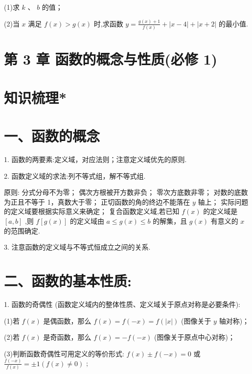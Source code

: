 (1)求 $k$ 、 $b$ 的值；

(2)当 $x$ 满足 $f\left( x\right)  > g\left( x\right)$ 时,求函数 $y = \frac{g\left( x\right)  + 1}{f\left( x\right) } + \left| {x - 4}\right|  + \left| {x + 2}\right|$ 的最小值.

\section*{第 3 章 函数的概念与性质(必修 1)}

\section*{知识梳理*}

\section*{一、函数的概念}

1. 函数的两要素:定义域，对应法则；注意定义域优先的原则.

2. 函数定义域的求法:列不等式组，解不等式组.

原则:   分式分母不为零；   偶次方根被开方数非负；   零次方底数非零；   对数的底数为正且不等于 1，真数大于零；  正切函数的角的终边不能落在 $y$ 轴上；  实际问题的定义域要根据实际意义来确定；  复合函数定义域,若已知 $f\left( x\right)$ 的定义域是 $\left\lbrack  {a,b}\right\rbrack$ ,则 $f\left\lbrack  {g\left( x\right) }\right\rbrack$ 的定义域由 $a \leq  g\left( x\right)  \leq  b$ 的解集，且 $g\left( x\right)$ 有意义的 $x$ 的范围确定.

3. 注意函数的定义域与不等式恒成立之间的关系.

\section*{二、函数的基本性质:}

1. 函数的奇偶性 (函数定义域内的整体性质、定义域关于原点对称是必要条件):

(1)若 $f\left( x\right)$ 是偶函数，那么 $f\left( x\right)  = f\left( {-x}\right)  = f\left( \left| x\right| \right)$ (图像关于 $y$ 轴对称)；

(2)若 $f\left( x\right)$ 是奇函数，那么 $f\left( x\right)  =  - f\left( {-x}\right)$ (图像关于原点中心对称)；

(3)判断函数奇偶性可用定义的等价形式: $f\left( x\right)  \pm  f\left( {-x}\right)  = 0$ 或 $\frac{f\left( {-x}\right) }{f\left( x\right) } =  \pm  1\left( {f\left( x\right)  \neq  0}\right)$ ;

